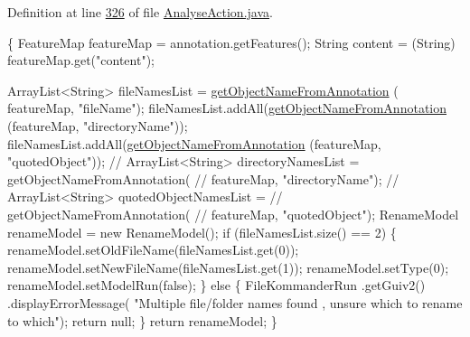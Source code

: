 Definition at line \hyperlink{L326}{326} of file \hyperlink{}{Analyse\-Action.\-java}.


\begin{DoxyCode}
                                                                               
        \{
        FeatureMap featureMap = annotation.getFeatures();
        String content = (String) featureMap.get(\textcolor{stringliteral}{"content"});

        ArrayList<String> fileNamesList = \hyperlink{classcom_1_1poly_1_1nlp_1_1filekommander_1_1file_1_1actions_1_1_analyse_action_a8652e1bba48585a8c416e6e212fe4766}{getObjectNameFromAnnotation}
      (
                featureMap, \textcolor{stringliteral}{"fileName"});
        fileNamesList.addAll(\hyperlink{classcom_1_1poly_1_1nlp_1_1filekommander_1_1file_1_1actions_1_1_analyse_action_a8652e1bba48585a8c416e6e212fe4766}{getObjectNameFromAnnotation}
      (featureMap,
                \textcolor{stringliteral}{"directoryName"}));
        fileNamesList.addAll(\hyperlink{classcom_1_1poly_1_1nlp_1_1filekommander_1_1file_1_1actions_1_1_analyse_action_a8652e1bba48585a8c416e6e212fe4766}{getObjectNameFromAnnotation}
      (featureMap,
                \textcolor{stringliteral}{"quotedObject"}));
        \textcolor{comment}{// ArrayList<String> directoryNamesList = getObjectNameFromAnnotation(}
        \textcolor{comment}{// featureMap, "directoryName");}
        \textcolor{comment}{// ArrayList<String> quotedObjectNamesList =}
        \textcolor{comment}{// getObjectNameFromAnnotation(}
        \textcolor{comment}{// featureMap, "quotedObject");}
        RenameModel renameModel = \textcolor{keyword}{new} RenameModel();
        \textcolor{keywordflow}{if} (fileNamesList.size() == 2) \{
            renameModel.setOldFileName(fileNamesList.get(0));
            renameModel.setNewFileName(fileNamesList.get(1));
            renameModel.setType(0);
            renameModel.setModelRun(\textcolor{keyword}{false});
        \} \textcolor{keywordflow}{else} \{
            FileKommanderRun
                    .getGuiv2()
                    .displayErrorMessage(
                            \textcolor{stringliteral}{"Multiple file/folder names found , unsure which to
       rename to which"});
            \textcolor{keywordflow}{return} null;
        \}
        \textcolor{keywordflow}{return} renameModel;
    \}
\end{DoxyCode}
